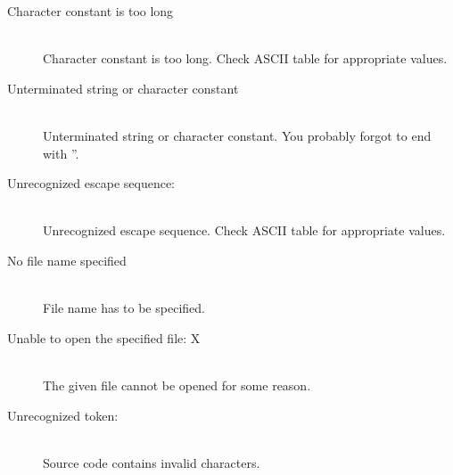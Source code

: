 \begin{description}
            \item[Character constant is too long]~\\
                Character constant is too long. Check ASCII table for appropriate values.
            \item[Unterminated string or character constant]~\\
                Unterminated string or character constant. You probably forgot to end with ''.
            \item[Unrecognized escape sequence:]~\\
                Unrecognized escape sequence. Check ASCII table for appropriate values.
            \item[No file name specified]~\\
                File name has to be specified.~\\
            \item[Unable to open the specified file: X]~\\
                The given file cannot be opened for some reason.
            \item[Unrecognized token:]~\\
                Source code contains invalid characters.
        \end{description}

